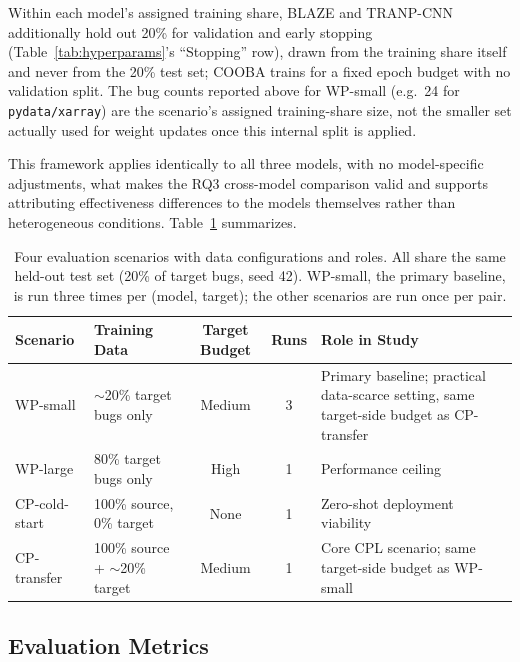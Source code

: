 \documentclass[a4paper,fleqn]{cas-dc}
\begin{document}
Within each model's assigned training share, BLAZE and TRANP-CNN
additionally hold out 20\% for validation and early stopping
(Table~\ref{tab:hyperparams}'s ``Stopping'' row), drawn from the training
share itself and never from the 20\% test set; COOBA trains for a fixed
epoch budget with no validation split. The bug counts reported above for
WP-small (e.g.\ 24 for \texttt{pydata/xarray}) are the scenario's assigned
training-share size, not the smaller set actually used for weight updates
once this internal split is applied.

This framework applies identically to all three models, with no
model-specific adjustments, what makes the RQ3 cross-model comparison
valid and supports attributing effectiveness differences to the models
themselves rather than heterogeneous conditions. Table~\ref{tab:scenarios}
summarizes.

\begin{table}[t]
\centering
\caption{Four evaluation scenarios with data configurations and roles. All share
the same held-out test set (20\% of target bugs, seed 42). WP-small, the primary
baseline, is run three times per (model, target); the other scenarios are run once
per pair.}
\label{tab:scenarios}
\small
\begin{tabular}{@{}llccp{4.4cm}@{}}
\toprule
\textbf{Scenario} & \textbf{Training Data} & \textbf{Target Budget} & \textbf{Runs} & \textbf{Role in Study} \\
\midrule
WP-small      & $\sim$20\% target bugs only         & Medium & 3 & Primary baseline; practical data-scarce setting, same target-side budget as CP-transfer \\
WP-large      & 80\% target bugs only               & High   & 1 & Performance ceiling \\
CP-cold-start & 100\% source, 0\% target            & None   & 1 & Zero-shot deployment viability \\
CP-transfer   & 100\% source + $\sim$20\% target    & Medium & 1 & Core CPL scenario; same target-side budget as WP-small \\
\bottomrule
\end{tabular}
\end{table}

\subsection{Evaluation Metrics}
\label{sec:metrics}
\end{document}
